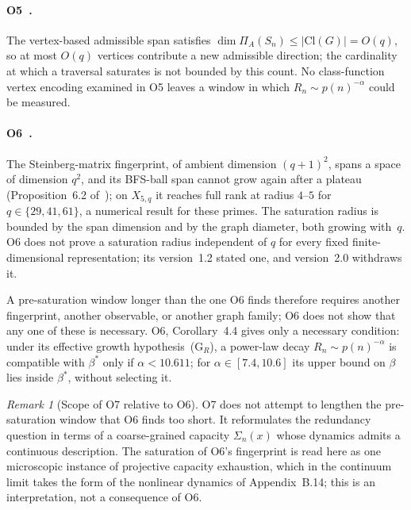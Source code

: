 \documentclass[11pt,a4paper]{article}
\theoremstyle{definition}
\theoremstyle{remark}
\newtheorem{remark}[theorem]{Remark}
\begin{document}
    \paragraph{O5~\cite{Beau2026a9}.}
      The vertex-based admissible span satisfies $\dim\Pi_A(S_n) \leq |\mathrm{Cl}(G)| = O(q)$, so at
      most $O(q)$ vertices contribute a new admissible direction; the cardinality at which a traversal
      saturates is not bounded by this count.
      No class-function vertex encoding examined in O5 leaves a window in which
      $R_n \sim p(n)^{-\alpha}$ could be measured.

    \paragraph{O6~\cite{Beau2026a10}.}
      The Steinberg-matrix fingerprint, of ambient dimension $(q+1)^2$, spans a space of dimension
      $q^2$, and its BFS-ball span cannot grow again after a plateau (Proposition~6.2
      of~\cite{Beau2026a10}); on $X_{5,q}$ it reaches full rank at radius $4$--$5$ for
      $q \in \{29,41,61\}$, a numerical result for these primes.
      The saturation radius is bounded by the span dimension and by the graph diameter, both
      growing with~$q$.
      O6 does not prove a saturation radius independent of $q$ for every fixed finite-dimensional
      representation; its version~1.2 stated one, and version~2.0 withdraws it.

      A pre-saturation window longer than the one O6 finds therefore requires another fingerprint,
      another observable, or another graph family; O6 does not show that any one of these is
      necessary.
      O6, Corollary~4.4 gives only a necessary condition: under its effective growth
      hypothesis~(G$_R$), a power-law decay $R_n \sim p(n)^{-\alpha}$ is compatible with $\beta^*$ only if
      $\alpha < 10.611$; for $\alpha \in [7.4, 10.6]$ its upper bound on $\beta$ lies inside $\beta^*$, without
      selecting it.

      \begin{remark}[Scope of O7 relative to O6]
        \label{rem:o7-scope}
        O7 does not attempt to lengthen the pre-saturation window that O6 finds too short.
        It reformulates the redundancy question in terms of a coarse-grained capacity $\Sigma_n(x)$
        whose dynamics admits a continuous description.
        The saturation of O6's fingerprint is read here as one microscopic instance of projective
        capacity exhaustion, which in the continuum limit takes the form of the nonlinear dynamics of
        Appendix~B.14; this is an interpretation, not a consequence of O6.
      \end{remark}
\end{document}
